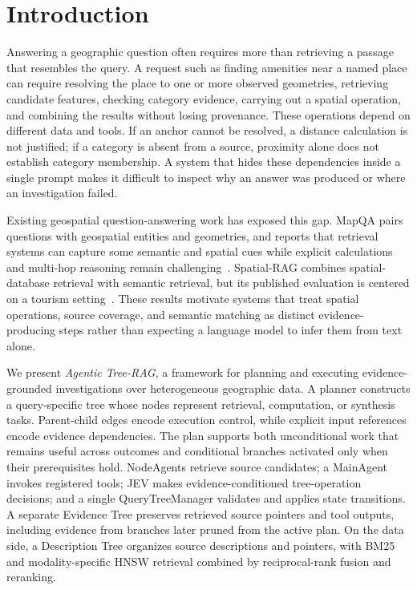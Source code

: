 \section{Introduction}
Answering a geographic question often requires more than retrieving a passage that resembles the query. A request such as finding amenities near a named place can require resolving the place to one or more observed geometries, retrieving candidate features, checking category evidence, carrying out a spatial operation, and combining the results without losing provenance. These operations depend on different data and tools. If an anchor cannot be resolved, a distance calculation is not justified; if a category is absent from a source, proximity alone does not establish category membership. A system that hides these dependencies inside a single prompt makes it difficult to inspect why an answer was produced or where an investigation failed.

Existing geospatial question-answering work has exposed this gap. MapQA pairs questions with geospatial entities and geometries, and reports that retrieval systems can capture some semantic and spatial cues while explicit calculations and multi-hop reasoning remain challenging~\cite{li2025mapqa}. Spatial-RAG combines spatial-database retrieval with semantic retrieval, but its published evaluation is centered on a tourism setting~\cite{yu2025spatialrag}. These results motivate systems that treat spatial operations, source coverage, and semantic matching as distinct evidence-producing steps rather than expecting a language model to infer them from text alone.

We present \emph{Agentic Tree-RAG}, a framework for planning and executing evidence-grounded investigations over heterogeneous geographic data. A planner constructs a query-specific tree whose nodes represent retrieval, computation, or synthesis tasks. Parent-child edges encode execution control, while explicit input references encode evidence dependencies. The plan supports both unconditional work that remains useful across outcomes and conditional branches activated only when their prerequisites hold. NodeAgents retrieve source candidates; a MainAgent invokes registered tools; JEV makes evidence-conditioned tree-operation decisions; and a single QueryTreeManager validates and applies state transitions. A separate Evidence Tree preserves retrieved source pointers and tool outputs, including evidence from branches later pruned from the active plan. On the data side, a Description Tree organizes source descriptions and pointers, with BM25 and modality-specific HNSW retrieval combined by reciprocal-rank fusion and reranking.

